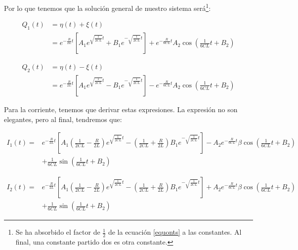 \documentclass[a4paper,12pt]{article}
\begin{document}
Por lo que tenemos que la solución general de nuestro sistema será\footnote{Se ha absorbido el factor de $\frac{1}{2}$ de la ecuación \eqref{equonts} a las constantes. Al final, una constante partido dos es otra constante.}:

\begin{equation}
  \begin{aligned}
     Q_1(t)& = \eta(t) + \xi(t) \\&= e^{-\frac{R}{2L} t}  \left[A_1 e^{\sqrt{\frac{1}{2CL}} t} + B_1 e^{-\sqrt{\frac{1}{2CL}} t}\right] + e^{-\frac{R}{6CL} t}A_2\cos{\left(\frac{1}{6CL} t + B_2\right)}  
  \end{aligned}
\end{equation}

\begin{equation}
\begin{aligned}
    Q_2(t) &= \eta(t) - \xi(t) \\&= e^{-\frac{R}{2L} t}  \left[A_1 e^{\sqrt{\frac{1}{2CL}} t} - B_1 e^{-\sqrt{\frac{1}{2CL}} t}\right] -e^{-\frac{R}{6CL} t} A_2\cos{\left(\frac{1}{6CL} t + B_2\right)}
\end{aligned}
\end{equation}

Para la corriente, tenemos que derivar estas expresiones. La expresión no son elegantes, pero al final, tendremos que:

\begin{equation}
\begin{aligned}
  I_1(t) =& e^{-\frac{R}{2L} t}  \left[A_1\left(\frac{1}{2CL}- \frac{R}{2L}\right) e^{\sqrt{\frac{1}{2CL}} t} - \left(\frac{1}{2CL}+ \frac{R}{2L}\right)B_1 e^{-\sqrt{\frac{1}{2CL}} t}\right] - A_2 e^{-\frac{R}{6CL} t} \beta\cos{\left(\frac{1}{6CL} t + B_2\right)}\\& + \frac{1}{6CL}\sin{\left(\frac{1}{6CL} t + B_2\right)}
\end{aligned}
\end{equation}

\begin{equation}
\begin{aligned}
  I_2(t) =& e^{-\frac{R}{2L} t}  \left[A_1\left(\frac{1}{2CL}- \frac{R}{2L}\right) e^{\sqrt{\frac{1}{2CL}} t} - \left(\frac{1}{2CL}+ \frac{R}{2L}\right)B_1 e^{-\sqrt{\frac{1}{2CL}} t}\right] + A_2 e^{-\frac{R}{6CL} t} \beta\cos{\left(\frac{1}{6CL} t + B_2\right)}\\& + \frac{1}{6CL}\sin{\left(\frac{1}{6CL} t + B_2\right)}
\end{aligned}
\end{equation}
\end{document}
